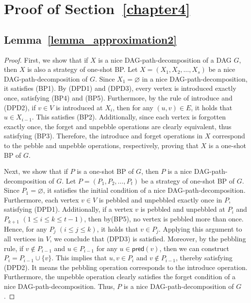 \documentclass[runningheads]{llncs}
\theoremstyle{plain}
\theoremstyle{definition}
\begin{document}
\section{Proof of Section~\ref{chapter4}}

\subsection{\textbf{Lemma~\ref{lemma_approximation2}}}\label{appendix_C1}
\begin{proof}
    First, we show that if $X$ is a nice DAG-path-decomposition of a DAG $G$, then $X$ is also a strategy of one-shot BP. Let $X=(X_1, X_2, \dots, X_s)$ be a nice DAG-path-decomposition of $G$. Since $X_1 = \varnothing$ in a nice DAG-path-decomposition, it satisfies (BP1). By (DPD1) and (DPD3), every vertex is introduced exactly once, satisfying (BP4) and (BP5). Furthermore, by the rule of introduce and (DPD2), if $v \in V$ is introduced at $X_i$, then for any $(u, v) \in E$, it holds that $u \in X_{i-1}$. This satisfies (BP2). Additionally, since each vertex is forgotten exactly once, the forget and unpebble operations are clearly equivalent, thus satisfying (BP3). Therefore, the introduce and forget operations in $X$ correspond to the pebble and unpebble operations, respectively, proving that $X$ is a one-shot BP of $G$.

    Next, we show that if $P$ is a one-shot BP of $G$, then $P$ is a nice DAG-path-decomposition of $G$. Let $P=(P_1, P_2, \dots, P_t)$ be a strategy of one-shot BP of $G$. Since $P_1 = \varnothing$, it satisfies the initial condition of a nice DAG-path-decomposition. Furthermore, each vertex $v \in V$ is pebbled and unpebbled exactly once in $P$, satisfying (DPD1). Additionally, if a vertex $v$ is pebbled and unpebbled at $P_i$ and $P_{k+1}$ $(1 \leq i \leq k \leq t-1)$, then by(BP5), no vertex is pebbled more than once. Hence, for any $P_j$ $(i \leq j \leq k)$, it holds that $v \in P_j$. Applying this argument to all vertices in $V$, we conclude that (DPD3) is satisfied. Moreover, by the pebbling rule, if $v \notin P_{i-1}$ and $u \in P_{i-1}$ for any $u \in \mathsf{pred}(v)$, then we can construct $P_i = P_{i-1} \cup \{v\}$. This implies that $u, v \in P_i$ and $v \notin P_{i-1}$, thereby satisfying (DPD2). It means the pebbling operation corresponds to the introduce operation. Furthermore, the unpebble operation clearly satisfies the forget condition of a nice DAG-path-decomposition. Thus, $P$ is a nice DAG-path-decomposition of $G$.
\end{proof}
\end{document}
